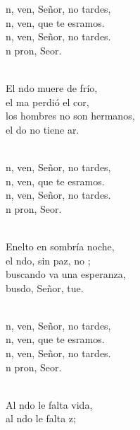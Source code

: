 \documentclass[12pt]{article}
\begin{document}
\begin{multicols*}{2}
\begin{cancion}%
	\begin{chorus}%
	n, ven, Señor, no tardes,\\
	n, ven, que te esramos.\\
	n, ven, Señor, no tardes.\\
	n pron, Seor.\\
	\end{chorus}%
	\jump\\
	El ndo muere de frío,\\
	el ma perdió el cor,\\
los hombres no son hermanos,\\
	el do no tiene ar.\\\jump\\
	\begin{chorus}%
	n, ven, Señor, no tardes,\\
	n, ven, que te esramos.\\
	n, ven, Señor, no tardes.\\
	n pron, Seor.\\
	\end{chorus}%
	\jump\\
	Enelto en sombría noche,\\
	el ndo, sin paz, no ;\\
buscando va una esperanza,\\
	busdo, Señor, tue.\\\jump\\
	\begin{chorus}%
	n, ven, Señor, no tardes,\\
	n, ven, que te esramos.\\
	n, ven, Señor, no tardes.\\
	n pron, Seor.\\
	\end{chorus}%
	\jump\\
	Al ndo le falta vida,\\
	al ndo le falta z;\\

\end{cancion}
\end{multicols*}
\end{document}
